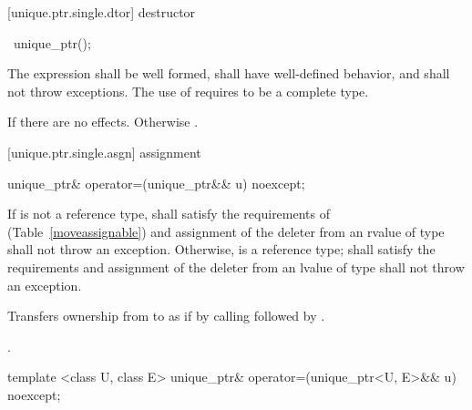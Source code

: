 [unique.ptr.single.dtor]{ destructor}

\begin{itemdecl}
~unique_ptr();
\end{itemdecl}

\begin{itemdescr}
\pnum
\requires The expression  shall be well formed,
shall have well-defined behavior, and shall not throw exceptions. \enternote The
use of  requires  to be a complete type.
\exitnote

\pnum
\effects If  there are no effects.
Otherwise .
\end{itemdescr}

[unique.ptr.single.asgn]{ assignment}

\begin{itemdecl}
unique_ptr& operator=(unique_ptr&& u) noexcept;
\end{itemdecl}

\begin{itemdescr}
\pnum
\requires If  is not a reference type,  shall satisfy the
requirements of  (Table~\ref{moveassignable}) and assignment
of the deleter from an rvalue of type  shall not throw an exception.
Otherwise,  is a reference type;
 shall satisfy the 
requirements and assignment of the deleter from an
lvalue of type  shall not throw an exception.

\pnum
\effects
Transfers ownership from  to  as if by calling
 followed by
.

\pnum
\returns {}.
\end{itemdescr}

\begin{itemdecl}
template <class U, class E> unique_ptr& operator=(unique_ptr<U, E>&& u) noexcept;
\end{itemdecl}

